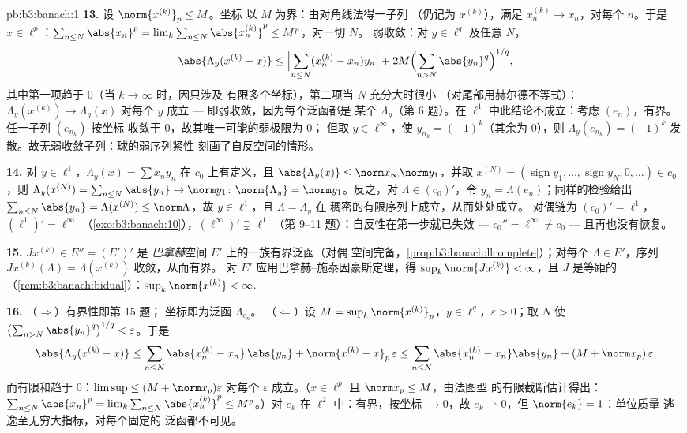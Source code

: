 \begin{solution}{pb:b3:banach:1}
\textbf{13.} 设 $\norm{x^{(k)}}_p \leq M$。坐标
以 $M$ 为界：由对角线法得一子列
（仍记为 $x^{(k)}$），满足 $x^{(k)}_n \to x_n$，对每个
$n$。于是 $x \in \ell^p$：$\sum_{n\leq N}\abs{x_n}^p =
\lim_k\sum_{n\leq N}\abs{x^{(k)}_n}^p \leq M^p$，对一切 $N$。
弱收敛：对 $y \in \ell^q$ 及任意 $N$，
\[
\abs{\Lambda_y(x^{(k)} - x)} \leq
\Bigl|\sum_{n \leq N}(x^{(k)}_n - x_n)y_n\Bigr|
+ 2M\Bigl(\sum_{n>N}\abs{y_n}^q\Bigr)^{1/q},
\]
其中第一项趋于 $0$（当 $k \to \infty$ 时，因只涉及
有限多个坐标），第二项当 $N$ 充分大时很小
（对尾部用赫尔德不等式）：$\Lambda_y(x^{(k)}) \to \Lambda_y(x)$
对每个 $y$ 成立 --- 即弱收敛，因为每个泛函都是
某个 $\Lambda_y$（第 6 题）。在 $\ell^1$ 中此结论不成立：考虑
$(e_n)$，有界。任一子列 $(e_{n_k})$ 按坐标
收敛于 $0$，故其唯一可能的弱极限为 $0$；
但取 $y \in \ell^\infty$，使 $y_{n_k} =
(-1)^k$（其余为 $0$），则 $\Lambda_y(e_{n_k}) = (-1)^k$
发散。故无弱收敛子列：球的弱序列紧性
刻画了自反空间的情形。

\textbf{14.} 对 $y \in \ell^1$，$\Lambda_y(x) = \sum x_ny_n$
在 $c_0$ 上有定义，且 $\abs{\Lambda_y(x)} \leq \norm
x_\infty\norm y_1$，并取 $x^{(N)} =
(\operatorname{sign}y_1, \dots, \operatorname{sign}y_N, 0,
\dots) \in c_0$，则 $\Lambda_y(x^{(N)}) =
\sum_{n\leq N}\abs{y_n} \to \norm y_1$:
$\norm{\Lambda_y} = \norm y_1$。反之，对 $\Lambda \in
(c_0)'$，令 $y_n = \Lambda(e_n)$；同样的检验给出
$\sum_{n \leq N}\abs{y_n} = \Lambda(x^{(N)}) \leq
\norm\Lambda$，故 $y \in \ell^1$，且 $\Lambda = \Lambda_y$ 在
稠密的有限序列上成立，从而处处成立。
对偶链为 $(c_0)' = \ell^1$，$(\ell^1)' = \ell^\infty$
（\cref{exo:b3:banach:10}），$(\ell^\infty)' \supsetneq \ell^1$
（第 9--11 题）：自反性在第一步就已失效
--- $c_0'' = \ell^\infty \neq c_0$ --- 且再也没有恢复。

\textbf{15.} $J x^{(k)} \in E'' = (E')'$ 是
\emph{巴拿赫}空间 $E'$ 上的一族有界泛函（对偶
空间完备，\cref{prop:b3:banach:llcomplete}）；对每个
$\Lambda \in E'$，序列 $Jx^{(k)}(\Lambda) =
\Lambda(x^{(k)})$ 收敛，从而有界。
对 $E'$ 应用巴拿赫–施泰因豪斯定理，得 $\sup_k\norm{Jx^{(k)}} <
\infty$，且 $J$ 是等距的
（\cref{rem:b3:banach:bidual}）：$\sup_k\norm{x^{(k)}} <
\infty$.

\textbf{16.} （$\Rightarrow$）有界性即第 15 题；
坐标即为泛函 $\Lambda_{e_n}$。
（$\Leftarrow$）设 $M = \sup_k\norm{x^{(k)}}_p$，$y \in
\ell^q$，$\varepsilon > 0$；取 $N$ 使
$\bigl(\sum_{n>N}\abs{y_n}^q\bigr)^{1/q} < \varepsilon$。于是
\[
\abs{\Lambda_y(x^{(k)} - x)} \leq
\sum_{n\leq N}\abs{x^{(k)}_n - x_n}\,\abs{y_n} +
\norm{x^{(k)} - x}_p\,\varepsilon
\leq \sum_{n\leq N}\abs{x^{(k)}_n - x_n}\abs{y_n} +
(M + \norm x_p)\,\varepsilon,
\]
而有限和趋于 $0$：$\limsup \leq (M + \norm
x_p)\varepsilon$ 对每个 $\varepsilon$ 成立。（$x \in
\ell^p$ 且 $\norm x_p \leq M$，由法图型
的有限截断估计得出：$\sum_{n \leq N}\abs{x_n}^p =
\lim_k\sum_{n\leq N}\abs{x^{(k)}_n}^p \leq M^p$。）对 $e_k$
在 $\ell^2$ 中：有界，按坐标 $\to 0$，故 $e_k
\rightharpoonup 0$，但 $\norm{e_k} = 1$：单位质量
逃逸至无穷大指标，对每个固定的
泛函都不可见。


\end{solution}

